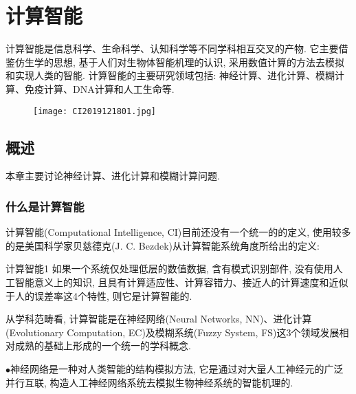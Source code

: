 \chapter{计算智能}
\begin{tcolorbox}[colback=white!50,colframe=orange!50,title=计算智能]
\begin{center}
计算智能是信息科学、生命科学、认知科学等不同学科相互交叉的产物. 它主要借鉴仿生学的思想, 基于人们对生物体智能机理的认识, 采用数值计算的方法去模拟和实现人类的智能.
计算智能的主要研究领域包括: 神经计算、进化计算、模糊计算、免疫计算、DNA计算和人工生命等.
\hfill
\end{center}
\end{tcolorbox}
\begin{figure}[H]
\centering
\texttt{[image: CI2019121801.jpg]}
\label{CI2019121801}
\end{figure}
\section{概述}
本章主要讨论神经计算、进化计算和模糊计算问题.
\subsection{什么是计算智能}
计算智能(Computational Intelligence, CI)目前还没有一个统一的的定义, 使用较多的是美国科学家贝慈德克(J. C. Bezdek)从计算智能系统角度所给出的定义:
\begin{mydef}{计算智能}{1}
如果一个系统仅处理低层的数值数据, 含有模式识别部件, 没有使用人工智能意义上的知识, 且具有计算适应性、计算容错力、接近人的计算速度和近似于人的误差率这4个特性, 则它是计算智能的.
\end{mydef}
\begin{remark}
  从学科范畴看, 计算智能是在神经网络(Neural Networks, NN)、进化计算(Evolutionary Computation, EC)及模糊系统(Fuzzy System, FS)这3个领域发展相对成熟的基础上形成的一个统一的学科概念.
\end{remark}

$\bullet$神经网络是一种对人类智能的结构模拟方法, 它是通过对大量人工神经元的广泛并行互联, 构造人工神经网络系统去模拟生物神经系统的智能机理的.

